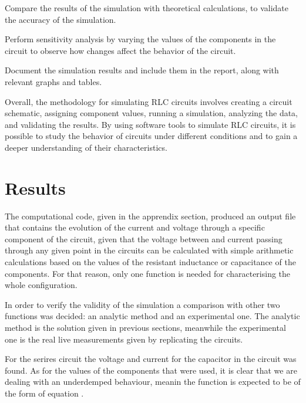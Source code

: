\documentclass[12pt,twoside]{extarticle}
\begin{document}
Compare the results of the simulation with theoretical calculations, to validate the accuracy of the simulation.

Perform sensitivity analysis by varying the values of the components in the circuit to observe how changes affect the behavior of the circuit.

Document the simulation results and include them in the report, along with relevant graphs and tables.

Overall, the methodology for simulating RLC circuits involves creating a circuit schematic, assigning component values, running a simulation, analyzing the data, and validating the results. By using software tools to simulate RLC circuits, it is possible to study the behavior of circuits under different conditions and to gain a deeper understanding of their characteristics.


\section{Results}
The computational code, given in the apprendix section, produced an output file that contains the evolution of the current and voltage through a specific component of the circuit, given that the voltage between and current passing through any given point in the circuits can be calculated with simple arithmetic calculations based on the values of the resistant inductance or capacitance of the components. For that reason, only one function is needed for characterising the whole configuration.

In order to verify the validity of the simulation a comparison with other two functions was decided: an analytic method and an experimental one. The analytic method is the solution given in previous sections, meanwhile the experimental one is the real live measurements given by replicating the circuits. 

For the serires circuit the voltage and current for the capacitor in the circuit was found. As for the values of the components that were used, it is clear that we are dealing with an underdemped behaviour, meanin the function is expected to be of the form of equation \label{eq:decayingsine}.   
\end{document}
